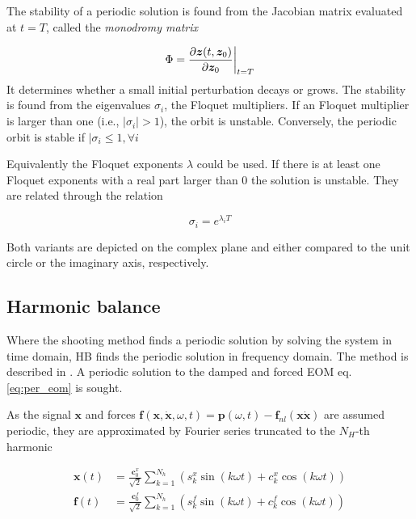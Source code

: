 The stability of a periodic solution is found from the Jacobian matrix evaluated
at $t=T$, called the \textit{monodromy matrix}

\begin{equation}
  \label{eq:sm_stab}
  \Phi = \frac{\partial \bm z(t, \bm z_0)}{\partial \bm z_0}\bigg|_{t=T}
\end{equation}
It determines whether a small initial perturbation decays or grows. The
stability is found from the eigenvalues $\sigma_i$, the Floquet multipliers. If an
Floquet multiplier is larger than one (i.e., $|\sigma_i|> 1$), the orbit is
unstable. Conversely, the periodic orbit is stable if $|\sigma_i \leq 1, \forall i$

Equivalently the Floquet exponents $\lambda$ could be used. If there is at least
one Floquet exponents with a real part larger than 0 the solution is unstable.
They are related through the relation

\begin{equation}
  \label{eq:floquet_relations}
  \sigma_i = e^{\lambda_i T}
\end{equation}

Both variants are depicted on the complex plane and either compared to the unit
circle or the imaginary axis, respectively.

\subsection{Harmonic balance}
\label{sec:harmonic_bal}

Where the shooting method finds a periodic solution by solving the system in
time domain, HB finds the periodic solution in frequency domain. The method is
described in \textcite{detroux2016a}. A periodic solution to the damped and forced
EOM eq. \eqref{eq:per_eom} is sought.

As the signal $\bm x$ and forces $\bm f(\bm x, \dot{\bm x}, \omega ,t) = \bm
p(\omega, t)- \bm f_{nl}(\bm x \dot{\bm x})$ are assumed periodic, they are
approximated by Fourier series truncated to the $N_H$-th harmonic

\begin{align}
  \label{eq:hb_x_expansion}
  \bm x(t) &= \frac{\bm c^x_0}{\sqrt{2}} \sum_{k=1}^{N_h} (s^x_k \sin(k\omega t) +
          c^x_k \cos(k\omega t)) \\
  \label{eq:hb_f_expansion}
  \bm f(t) &= \frac{\bm c^f_0}{\sqrt{2}} \sum_{k=1}^{N_h} (s^f_k \sin(k\omega t) +
          c^f_k \cos(k\omega t))
\end{align}


